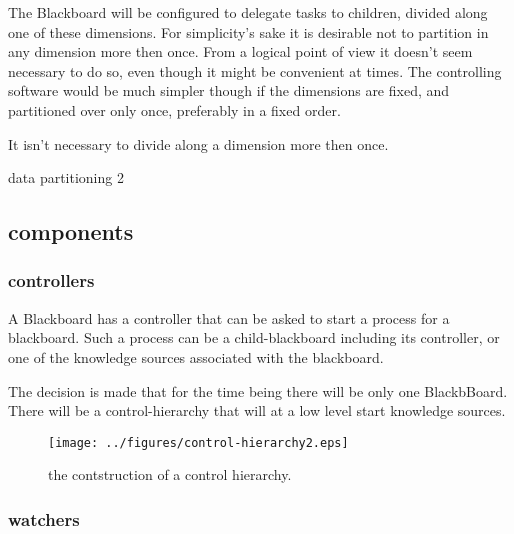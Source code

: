 \documentclass[]{lofar}
\begin{document}
      The Blackboard will be configured to delegate tasks to children,
      divided along one of these dimensions. For simplicity's sake it
      is desirable not to partition in any dimension more then
      once. From a logical point of view it doesn't seem necessary to
      do so, even though it might be convenient at times. The
      controlling software would be much simpler though if the
      dimensions are fixed, and partitioned over only once,
      preferably in a fixed order.

      \begin{assumption}
        It isn't necessary to divide along a dimension more then once.
        \caption{data partitioning 2\label{ass:devision}}
      \end{assumption}

    \subsection{components}
    \label{subsec:components}\hypertarget{subsec:components}{}

      \subsubsection{controllers}
      \label{subsubsec:controllers}\hypertarget{subsubsec:controllers}{}

        A Blackboard has a controller that can be asked to start a
        process for a blackboard. Such a process can be a
        child-blackboard including its controller, or one of the
        knowledge sources associated with the blackboard.

        The decision is made that for the time being there will be
        only one BlackbBoard. There will be a control-hierarchy that
        will at a low level start knowledge sources.

        \begin{figure}
          \texttt{[image: ../figures/control-hierarchy2.eps]}
          \hypertarget{fig:control-hierarchy2}{}
          \caption{the contstruction of a control
          hierarchy.\label{fig:control-hierarchy2}}
        \end{figure}

      \subsubsection{watchers}
      \label{subsubsec:watchers}\hypertarget{subsubsec:watchers}{}
\end{document}
